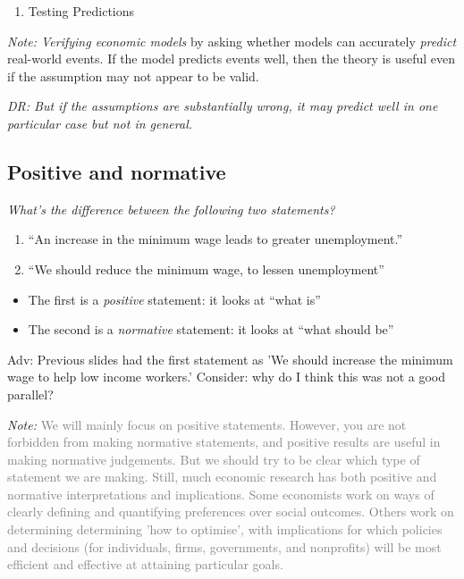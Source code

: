 \documentclass[]{article}
\providecommand{\tightlist}{%
  \setlength{\itemsep}{0pt}\setlength{\parskip}{0pt}}
\begin{document}
\begin{enumerate}
\def\labelenumi{\arabic{enumi}.}
\setcounter{enumi}{1}
\tightlist
\item
  Testing Predictions
\end{enumerate}

\emph{Note: Verifying economic models} by asking whether models can accurately \emph{predict} real-world events. If the model predicts events well, then the theory is useful even if the assumption may not appear to be valid.

\emph{DR: But if the assumptions are substantially wrong, it may predict well in one particular case but not in general.}

\hypertarget{positive-and-normative}{%
\subsection{Positive and normative}\label{positive-and-normative}}

\emph{What's the difference between the following two statements?}

\begin{enumerate}
\def\labelenumi{\arabic{enumi}.}
\item
  ``An increase in the minimum wage leads to greater unemployment.''
\item
  ``We should reduce the minimum wage, to lessen unemployment''
\end{enumerate}

\begin{itemize}
\item
  The first is a \emph{positive} statement: it looks at ``what is''
\item
  The second is a \emph{normative} statement: it looks at ``what should be''
\end{itemize}

\medskip

\textcolor{RawSienna}{Adv: Previous slides had the first statement as 'We should increase the minimum wage to help low income workers.'  Consider: why do I think this was not a good parallel?}

\medskip

\emph{Note:} \textcolor{gray}{We will mainly focus on positive statements.  However, you are not forbidden from making normative statements, and positive results are useful in making normative judgements.  But we should try to be clear which type of statement we are making.  Still, much economic research has both positive and normative interpretations and implications.  Some economists work on ways of clearly defining and quantifying preferences over social outcomes.  Others work on determining determining 'how to optimise', with implications for which policies and decisions  (for individuals, firms, governments, and nonprofits) will be most efficient and effective at attaining particular goals.}
\end{document}
